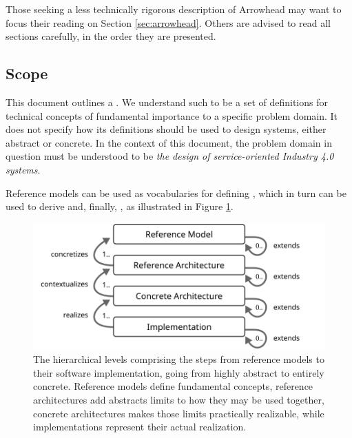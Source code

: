 Those seeking a less technically rigorous description of Arrowhead may want to focus their reading on Section \ref{sec:arrowhead}.
Others are advised to read all sections carefully, in the order they are presented.

\subsection{Scope}
\label{sec:introduction:scope}

This document outlines a .
We understand such to be a set of definitions for technical concepts of fundamental importance to a specific problem domain.
It does not specify how its definitions should be used to design systems, either abstract or concrete.
In the context of this document, the problem domain in question must be understood to be \textit{the design of service-oriented Industry 4.0 systems}.

Reference models can be used as vocabularies for defining , which in turn can be used to derive  and, finally, , as illustrated in Figure \ref{fig:model-implementation-hierarchy}.

\vspace*{\fill}

\begin{figure}[ht]
  \centering
  \includegraphics{figures/model-implementation-hierarchy}
  \caption{
    The hierarchical levels comprising the steps from reference models to their software implementation, going from highly abstract to entirely concrete.
    Reference models define fundamental concepts, reference architectures add abstracts limits to how they may be used together, concrete architectures makes those limits practically realizable, while implementations represent their actual realization.
  }
  \label{fig:model-implementation-hierarchy}
\end{figure}

